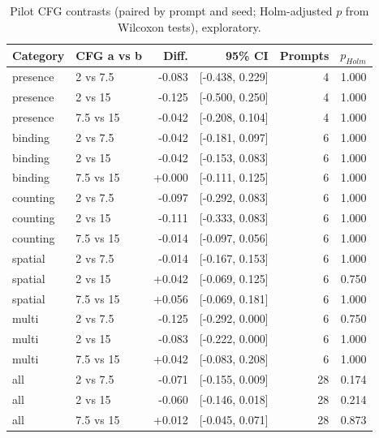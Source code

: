 \begin{table}[t]
\centering\small
\caption{Pilot CFG contrasts (paired by prompt and seed; Holm-adjusted $p$ from Wilcoxon tests), exploratory.}
\label{tab:pilot-cfg}
\begin{tabular}{llrrrr}
\toprule
Category & CFG a vs b & Diff. & 95\% CI & Prompts & $p_{Holm}$ \\
\midrule
presence & 2 vs 7.5 & -0.083 & [-0.438, 0.229] & 4 & 1.000 \\
presence & 2 vs 15 & -0.125 & [-0.500, 0.250] & 4 & 1.000 \\
presence & 7.5 vs 15 & -0.042 & [-0.208, 0.104] & 4 & 1.000 \\
binding & 2 vs 7.5 & -0.042 & [-0.181, 0.097] & 6 & 1.000 \\
binding & 2 vs 15 & -0.042 & [-0.153, 0.083] & 6 & 1.000 \\
binding & 7.5 vs 15 & +0.000 & [-0.111, 0.125] & 6 & 1.000 \\
counting & 2 vs 7.5 & -0.097 & [-0.292, 0.083] & 6 & 1.000 \\
counting & 2 vs 15 & -0.111 & [-0.333, 0.083] & 6 & 1.000 \\
counting & 7.5 vs 15 & -0.014 & [-0.097, 0.056] & 6 & 1.000 \\
spatial & 2 vs 7.5 & -0.014 & [-0.167, 0.153] & 6 & 1.000 \\
spatial & 2 vs 15 & +0.042 & [-0.069, 0.125] & 6 & 0.750 \\
spatial & 7.5 vs 15 & +0.056 & [-0.069, 0.181] & 6 & 1.000 \\
multi & 2 vs 7.5 & -0.125 & [-0.292, 0.000] & 6 & 0.750 \\
multi & 2 vs 15 & -0.083 & [-0.222, 0.000] & 6 & 1.000 \\
multi & 7.5 vs 15 & +0.042 & [-0.083, 0.208] & 6 & 1.000 \\
all & 2 vs 7.5 & -0.071 & [-0.155, 0.009] & 28 & 0.174 \\
all & 2 vs 15 & -0.060 & [-0.146, 0.018] & 28 & 0.214 \\
all & 7.5 vs 15 & +0.012 & [-0.045, 0.071] & 28 & 0.873 \\
\bottomrule
\end{tabular}
\end{table}
